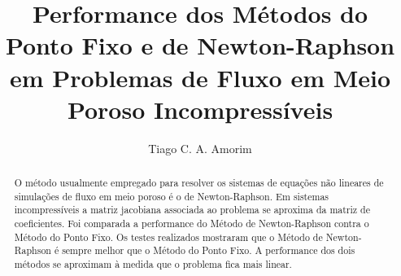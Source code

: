 \documentclass[final,5p]{elsarticle}
\numberwithin{equation}{section}
\begin{document}
\begin{frontmatter}



\title{Performance dos Métodos do Ponto Fixo e de Newton-Raphson em Problemas de Fluxo em Meio Poroso Incompressíveis}


\author{Tiago C. A. Amorim}

\begin{abstract}

    O método usualmente empregado para resolver os sistemas de equações não lineares de simulações de fluxo em meio poroso é o de Newton-Raphson. Em sistemas incompressíveis a matriz jacobiana associada ao problema se aproxima da matriz de coeficientes. Foi comparada a performance do Método de Newton-Raphson contra o Método do Ponto Fixo. Os testes realizados mostraram que o Método de Newton-Raphson é sempre melhor que o Método do Ponto Fixo. A performance dos dois métodos se aproximam à medida que o problema fica mais linear.


\end{abstract}
\end{frontmatter}
\end{document}
